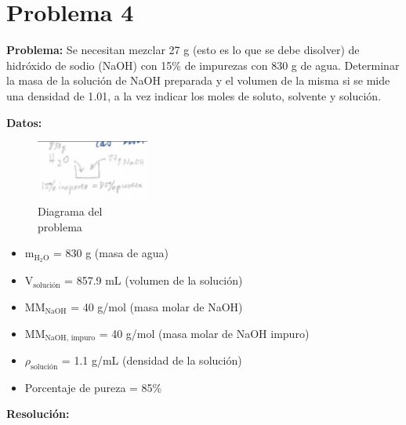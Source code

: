 \documentclass{article}
\begin{document}
\newpage
\section*{Problema 4}
\textbf{Problema:}
Se necesitan mezclar 27 g (esto es lo que se debe disolver) de hidróxido de sodio (NaOH) con 15\% de impurezas con 830 g de agua. Determinar la masa de la solución de NaOH preparada y el volumen de la misma si se mide una densidad de 1.01, a la vez indicar los moles de soluto, solvente y solución.


\noindent\textbf{Datos:} %

\begin{figure}[H]
    \begin{minipage}[t]{0.3\textwidth} %
        \raggedright %
        \includegraphics[width=\linewidth, height=2cm]{./problema4_diagrama.png} %
        \caption{Diagrama del \\ problema}
    \end{minipage}
\end{figure}

\begin{itemize}
\item m$_{\text{H}_2\text{O}}$ = 830 g (masa de agua)
\item V$_{\text{solución}}$ = 857.9 mL (volumen de la solución)
\item MM$_{\text{NaOH}}$ = 40 g/mol (masa molar de NaOH)
\item MM$_{\text{NaOH, impuro}}$ = 40 g/mol (masa molar de NaOH impuro)
\item $\rho_{\text{solución}}$ = 1.1 g/mL (densidad de la solución)
\item Porcentaje de pureza = 85\%
\end{itemize}


\noindent\textbf{Resolución:} %
\end{document}
